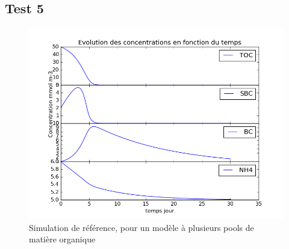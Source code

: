 \subsection{Test 5}


\begin{figure}[h!]
  \includegraphics[width=\textwidth]{partie1/Test5.png}
  \caption{Simulation de r\'ef\'erence, pour un mod\`ele \`a plusieurs pools de mati\`ere organique
  }
  \label{fig:partie1test5}
\end{figure}

